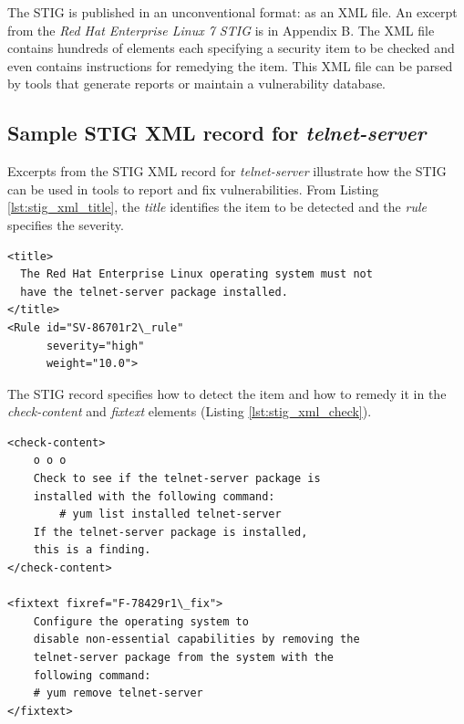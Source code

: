 \documentclass[12pt]{article}
\begin{document}
The STIG is published in an unconventional format: as an XML file.  An excerpt
from the \emph{Red Hat Enterprise Linux 7 STIG} is in Appendix B.  The XML file
contains hundreds of elements each specifying a security item to be checked
and even contains instructions for remedying the item.  This XML file can be
parsed by tools that generate reports or maintain a vulnerability database.

\subsection{Sample STIG XML record for \emph{telnet-server}}

Excerpts from the STIG XML record for \emph{telnet-server} illustrate how the
STIG can be used in tools to report and fix vulnerabilities.  From Listing
\ref{lst:stig_xml_title}, the \emph{title} identifies the item to be detected and
the \emph{rule} specifies the severity.

\lstset{
    language=xml,
    basicstyle=\footnotesize\ttfamily,
    linewidth=5.0in,
    frame=single,
    showstringspaces=false
}
\begin{adjustwidth}{0.5in}{0.0in}
\begin{lstlisting}[caption={STIG record \emph{title} and \emph{rule}},
label={lst:stig_xml_title}]
<title>
  The Red Hat Enterprise Linux operating system must not
  have the telnet-server package installed.
</title>
<Rule id="SV-86701r2\_rule"
      severity="high"
      weight="10.0">
\end{lstlisting}
\end{adjustwidth}
\vspace{0.8cm}

The STIG record specifies how to detect the item and how to remedy it in the
\emph{check-content} and \emph{fixtext} elements (Listing
\ref{lst:stig_xml_check}).

\lstset{
    language=xml,
    basicstyle=\footnotesize\ttfamily,
    linewidth=5.0in,
    frame=single,
    showstringspaces=false
}
\begin{adjustwidth}{0.5in}{0.0in}
\begin{minipage}{\linewidth}
\begin{lstlisting}[caption={STIG record \emph{check-content} and \emph{fixtext}},
label={lst:stig_xml_check}]
<check-content>
    o o o
    Check to see if the telnet-server package is
    installed with the following command:
        # yum list installed telnet-server
    If the telnet-server package is installed,
    this is a finding.
</check-content>

<fixtext fixref="F-78429r1\_fix">
    Configure the operating system to
    disable non-essential capabilities by removing the
    telnet-server package from the system with the
    following command:
    # yum remove telnet-server
</fixtext>
\end{lstlisting}
\end{minipage}
\end{adjustwidth}
\vspace{0.8cm}
\end{document}

